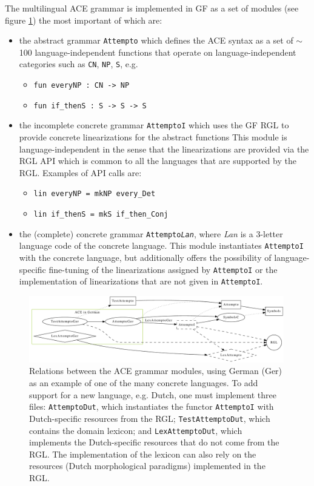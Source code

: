 \documentclass[a4paper]{article}
\begin{document}
The multilingual ACE grammar is implemented in GF as a set of modules
(see figure \ref{fig:modules}) the most important of which are:

\begin{itemize}
\item the abstract grammar \texttt{Attempto} which defines the ACE syntax as
a set of $\sim$100 language-independent functions
that operate on language-independent categories such as \texttt{CN},
\texttt{NP}, \texttt{S}, e.g.
\begin{itemize}
\item \verb!fun everyNP : CN -> NP!
\item \verb!fun if_thenS : S -> S -> S!
\end{itemize}

\item the incomplete concrete grammar \texttt{AttemptoI} which uses the GF RGL
to provide concrete linearizations for the abstract functions
This module
is language-independent in the sense that the linearizations are provided
via the RGL API which is common to all the languages that are supported by the
RGL. Examples of API calls are:
\begin{itemize}
\item \verb!lin everyNP = mkNP every_Det!
\item \verb!lin if_thenS = mkS if_then_Conj!
\end{itemize}

\item the (complete) concrete grammar \texttt{Attempto\textit{Lan}}, where
\textit{Lan} is a 3-letter language code of the concrete language. This
module instantiates \texttt{AttemptoI} with the concrete language, but
additionally offers the possibility of language-specific fine-tuning of the
linearizations assigned by \texttt{AttemptoI} or the implementation of
linearizations that are not given in \texttt{AttemptoI}.
\end{itemize}

\begin{figure}[ht]
\centering
\includegraphics[width=0.99\textwidth]{modules}
\caption[Relations between the ACE grammar modules]
{Relations between the ACE grammar modules, using German (Ger) as an example
of one of the many concrete languages. To add support for a new language,
e.g. Dutch, one must implement three files:
\texttt{AttemptoDut}, which
instantiates the functor \texttt{AttemptoI} with Dutch-specific resources
from the RGL;
\texttt{TestAttemptoDut}, which contains the domain lexicon; and
\texttt{LexAttemptoDut}, which implements the Dutch-specific resources that
do not come from the RGL. The implementation of the lexicon can also
rely on the resources (Dutch morphological paradigms) implemented
in the RGL.}
\label{fig:modules}
\end{figure}
\end{document}

